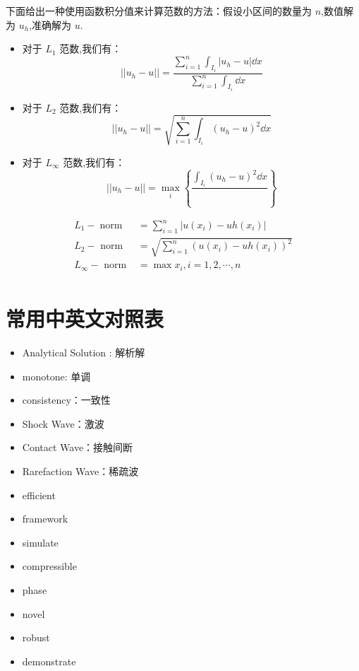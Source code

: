 \documentclass{book}
\begin{document}
下面给出一种使用函数积分值来计算范数的方法：假设小区间的数量为 $n$,数值解为 $u_h$,准确解为 $u$.
\begin{itemize}
    \item 对于 $L_1$ 范数,我们有：
          \begin{equation}
              || u_{h}-u || = \frac{\sum_{i=1}^{n}\int_{I_i}|u_{h}-u|\dd x }{\sum_{i=1}^{n}\int_{I_i}\dd x}
          \end{equation}

    \item 对于 $L_2$ 范数,我们有：
          \begin{equation}
              || u_{h}-u || = \sqrt{\sum_{i=1}^{n}\int_{I_i}\left(u_{h}-u\right)^2\dd x}
          \end{equation}
    \item 对于 $L_\infty$ 范数,我们有：
          \begin{equation}
              || u_{h}-u || = \max_i \left\{\frac{\int_{I_i}\left(u_{h}-u\right)^2\dd x}{} \right\}
          \end{equation}
\end{itemize}


\begin{equation}
    \begin{aligned}
        L_{1}-\operatorname{norm} & =\sum_{i=1}^{n}\left|u\left(x_{i}\right)-u h\left(x_{i}\right)\right|            \\
        L_{2}-\text { norm }      & =\sqrt{\sum_{i=1}^{n}\left(u\left(x_{i}\right)-u h\left(x_{i}\right)\right)^{2}} \\
        L_{\infty}-\text { norm } & =\max x_i,i=1,2,\cdots,n                                                         \\
    \end{aligned}
\end{equation}
\section{常用中英文对照表}
\begin{itemize}
    \item Analytical Solution : 解析解
    \item monotone: 单调
    \item consistency：一致性
    \item Shock Wave：激波
    \item Contact Wave：接触间断
    \item Rarefaction Wave：稀疏波
    \item efficient
    \item framework
    \item simulate
    \item compressible
    \item phase
    \item novel
    \item robust
    \item demonstrate
\end{itemize}
\end{document}
